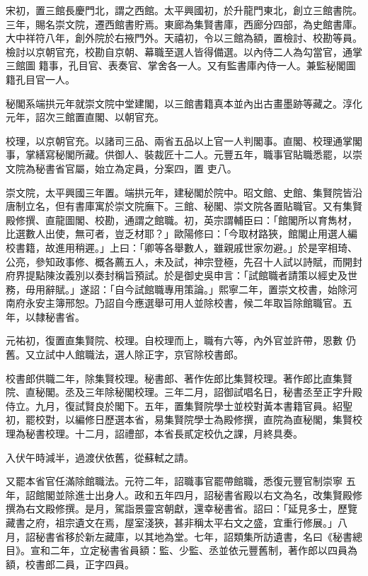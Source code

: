 \begin{pinyinscope}
 宋初，置三館長慶門北，謂之西館。太平興國初，於升龍門東北，創立三館書院。三年，賜名崇文院，遷西館書貯焉。東廊為集賢書庫，西廊分四部，為史館書庫。大中祥符八年，創外院於右掖門外。天禧初，令以三館為額，置檢討、校勘等員。檢討以京朝官充，校勘自京朝、幕職至選人皆得備選。以內侍二人為勾當官，通掌三館圖
 籍事，孔目官、表奏官、掌舍各一人。又有監書庫內侍一人。兼監秘閣圖籍孔目官一人。



 秘閣系端拱元年就崇文院中堂建閣，以三館書籍真本並內出古畫墨跡等藏之。淳化元年，詔次三館置直閣、以朝官充。



 校理，以京朝官充。以諸司三品、兩省五品以上官一人判閣事。直閣、校理通掌閣事，掌繕寫秘閣所藏。供御人、裝裁匠十二人。元豐五年，職事官貼職悉罷，以崇文院為秘書省官屬，始立為定員，分案四，置
 吏八。



 崇文院，太平興國三年置。端拱元年，建秘閣於院中。昭文館、史館、集賢院皆沿唐制立名，但有書庫寓於崇文院廡下。三館、秘閣、崇文院各置貼職官。又有集賢殿修撰、直龍圖閣、校勘，通謂之館職。初，英宗謂輔臣曰：「館閣所以育雋材，比選數人出使，無可者，豈乏材耶？」歐陽修曰：「今取材路狹，館閣止用選人編校書籍，故進用稍遲。」上曰：「卿等各舉數人，雖親戚世家勿避。」於是宰相琦、公亮，參知政事修、概各薦五人，未及試，神宗登極，先召十人試以詩賦，而開封府界提點陳汝義別以奏封稱旨預試。於是御史吳申言：「試館職者請策以經史及世務，毋用辭賦。」遂詔：「自今試館職專用策論。」熙寧二年，置崇文校書，始除河南府永安主簿邢恕。乃詔自今應選舉可用人並除校書，候二年取旨除館職官。五年，以隸秘書省。



 元祐初，復置直集賢院、校理。自校理而上，職有六等，內外官並許帶，恩數
 仍舊。又立試中人館職法，選人除正字，京官除校書郎。



 校書郎供職二年，除集賢校理。秘書郎、著作佐郎比集賢校理。著作郎比直集賢院、直秘閣。丞及三年除秘閣校理。三年二月，詔御試唱名日，秘書丞至正字升殿侍立。九月，復試賢良於閣下。五年，置集賢院學士並校對黃本書籍官員。紹聖初，罷校對，以編修日歷選本省，易集賢院學士為殿修撰，直院為直秘閣，集賢校理為秘書校理。十二月，詔禮部，本省長貳定校仇之課，月終具奏。



 入伏午時減半，過渡伏依舊，從蘇軾之請。



 又罷本省官任滿除館職法。元符二年，詔職事官罷帶館職，悉復元豐官制崇寧
 五年，詔館閣並除進士出身人。政和五年四月，詔秘書省殿以右文為名，改集賢殿修撰為右文殿修撰。是月，駕詣景靈宮朝獻，還幸秘書省。詔曰：「延見多士，歷覽藏書之府，祖宗遺文在焉，屋室淺狹，甚非稱太平右文之盛，宜重行修展。」八月，詔秘書省移於新左藏庫，以其地為堂。七年，詔類集所訪遺書，名曰《秘書總目》。宣和二年，立定秘書省員額：監、少監、丞並依元豐舊制，著作郎以四員為額，校書郎二員，正字四員。




\end{pinyinscope}
